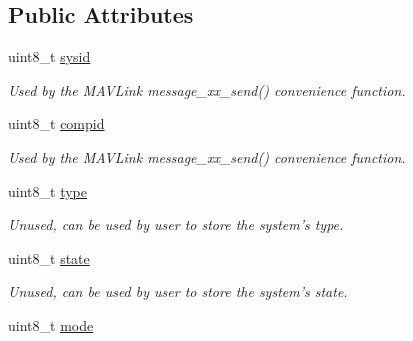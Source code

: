 \subsection*{Public Attributes}
\begin{DoxyCompactItemize}
\item 
\hypertarget{struct____mavlink__system_a3533dcc52fcacb13bb3190ae847e8260}{uint8\+\_\+t \hyperlink{struct____mavlink__system_a3533dcc52fcacb13bb3190ae847e8260}{sysid}}\label{struct____mavlink__system_a3533dcc52fcacb13bb3190ae847e8260}

\begin{DoxyCompactList}\small\item\em Used by the M\+A\+V\+Link message\+\_\+xx\+\_\+send() convenience function. \end{DoxyCompactList}\item 
\hypertarget{struct____mavlink__system_a1aec3b4f214beea3276a214c7498cb0f}{uint8\+\_\+t \hyperlink{struct____mavlink__system_a1aec3b4f214beea3276a214c7498cb0f}{compid}}\label{struct____mavlink__system_a1aec3b4f214beea3276a214c7498cb0f}

\begin{DoxyCompactList}\small\item\em Used by the M\+A\+V\+Link message\+\_\+xx\+\_\+send() convenience function. \end{DoxyCompactList}\item 
\hypertarget{struct____mavlink__system_aab94b93e251cac8de298a0ff90c41b8f}{uint8\+\_\+t \hyperlink{struct____mavlink__system_aab94b93e251cac8de298a0ff90c41b8f}{type}}\label{struct____mavlink__system_aab94b93e251cac8de298a0ff90c41b8f}

\begin{DoxyCompactList}\small\item\em Unused, can be used by user to store the system's type. \end{DoxyCompactList}\item 
\hypertarget{struct____mavlink__system_ac5afa4a95067ba7b21d4884a740cc413}{uint8\+\_\+t \hyperlink{struct____mavlink__system_ac5afa4a95067ba7b21d4884a740cc413}{state}}\label{struct____mavlink__system_ac5afa4a95067ba7b21d4884a740cc413}

\begin{DoxyCompactList}\small\item\em Unused, can be used by user to store the system's state. \end{DoxyCompactList}\item 
\hypertarget{struct____mavlink__system_a4bd3edea462570856b5575eecafd2b6d}{uint8\+\_\+t \hyperlink{struct____mavlink__system_a4bd3edea462570856b5575eecafd2b6d}{mode}}\label{struct____mavlink__system_a4bd3edea462570856b5575eecafd2b6d}


\end{DoxyCompactItemize}
